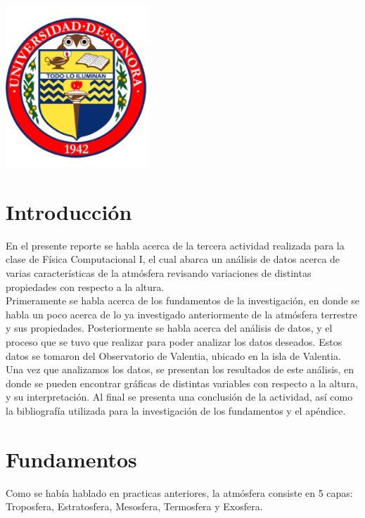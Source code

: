 \documentclass[12pt]{article}
\begin{document}
\begin{titlepage}
\includegraphics[width=0.4\textwidth]{logo.png}\\
 

\vfill %

\end{titlepage}

\section{Introducción}
En el presente reporte se habla acerca de la tercera actividad realizada para la clase de Física Computacional I, el cual abarca un análisis de datos acerca de varias características de la atmósfera revisando variaciones de distintas propiedades con respecto a la altura. \\

Primeramente se habla acerca de los fundamentos de la investigación, en donde se habla un poco acerca de lo ya investigado anteriormente de la atmósfera terrestre y sus propiedades. Posteriormente se habla acerca del análisis de datos, y el proceso que se tuvo que realizar para poder analizar los datos deseados. Estos datos se tomaron del Observatorio de Valentia, ubicado en la isla de Valentia. Una vez que analizamos los datos, se presentan los resultados de este análisis, en donde se pueden encontrar gráficas de distintas variables con respecto a la altura, y su interpretación. Al final se presenta una conclusión de la actividad, así como la bibliografía utilizada para la investigación de los fundamentos y el apéndice. 

\section{Fundamentos}
Como se había hablado en practicas anteriores, la atmósfera consiste en 5 capas:     Troposfera, Estratosfera, Mesosfera, Termosfera y Exosfera. \\
\end{document}
